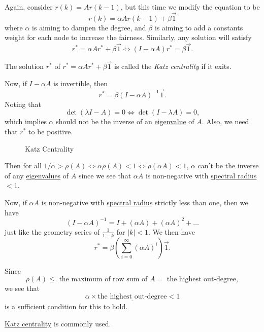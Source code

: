 \begin{problem}
Again, consider \(r(k) = Ar(k - 1)\), but this time we modify the equation to be
\[
	r(k) = \alpha Ar(k - 1) + \beta \vec{1}
\]
where \(\alpha\) is aiming to dampen the degree, and \(\beta\) is aiming to add a constants weight for each node to increase the fairness. Similarly, any solution will satisfy
\[
	r^{\ast} = \alpha Ar^{\ast} + \beta \vec{1}\iff (I - \alpha A)r^{\ast} = \beta \vec{1}.
\]
\begin{definition}\label{def:Katz-centrality}
	The solution \(r^{\ast} \) of \(r^{\ast} = \alpha Ar^{\ast} + \beta \vec{1}\) is called the \emph{Katz centrality} if it exits.
\end{definition}

Now, if \(I - \alpha A\) is invertible, then
\[
	r^{\ast} = \beta(I - \alpha A)^{-1} \vec{1}.
\]
Noting that
\[
	\det(\lambda I - A) = 0 \iff \det(I - \lambda A) = 0,
\]
which implies \(\alpha\) should not be the inverse of an \hyperref[def:eigenvalue]{eigenvalue} of \(A\). Also, we  need that \(r^{\ast}\) to be positive.

\begin{figure}[H]
	\centering
	\caption{Katz Centrality}
	\label{fig:katz-centrality}
\end{figure}

Then for all \(1/\alpha > \rho(A) \iff \alpha\rho(A)<1 \iff \rho(\alpha A)<1\), \(\alpha\) can't be the inverse of any \hyperref[def:eigenvalue]{eigenvalues} of \(A\) since we see that \(\alpha A\) is non-negative with \hyperref[def:spectral-radius]{spectral radius} \(<1\).

Now, if \(\alpha A\) is non-negative with \hyperref[def:spectral-radius]{spectral radius} strictly less than one, then we have
\[
	(I - \alpha A)^{-1} = I + (\alpha A) + (\alpha A)^2 + \dots
\]
just like the geometry series of \(\frac{1}{1-k}\) for \(\left\vert k \right\vert <1 \). We then have
\[
	r^* = \beta\left(\sum\limits_{i=0}^{\infty} (\alpha A)^i\right)\vec{1}.
\]

\begin{remark}
	Since
	\[
		\rho(A) \leq \text{ the maximum of row sum of }A = \text{ the highest out-degree},
	\]
	we see that
	\[
		\underline{\alpha \times \text{the highest out-degree}<1}
	\]
	is a sufficient condition for this to hold.
\end{remark}

\begin{note}
	\hyperref[def:Katz-centrality]{Katz centrality} is commonly used.
\end{note}
\end{problem}

